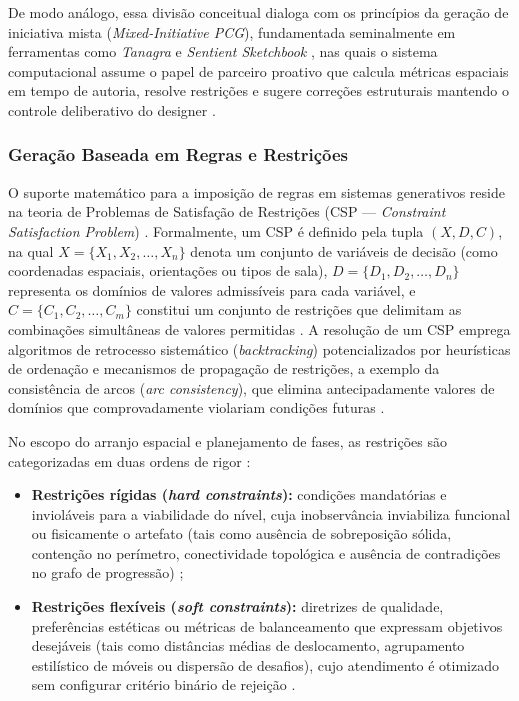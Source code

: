 De modo análogo, essa divisão conceitual dialoga com os princípios da geração de iniciativa mista (\textit{Mixed-Initiative PCG}), fundamentada seminalmente em ferramentas como \textit{Tanagra} \cite{tanagra} e \textit{Sentient Sketchbook} \cite{liapis2013sentient}, nas quais o sistema computacional assume o papel de parceiro proativo que calcula métricas espaciais em tempo de autoria, resolve restrições e sugere correções estruturais mantendo o controle deliberativo do designer \cite{tanagra, liapis2013sentient, lai2020towards, walton2020evaluating, wang2026designerlyloop}.

\subsubsection{Geração Baseada em Regras e Restrições}
\label{sec:geracao_restricoes}

O suporte matemático para a imposição de regras em sistemas generativos reside na teoria de Problemas de Satisfação de Restrições (CSP --- \textit{Constraint Satisfaction Problem}) \cite{russell2021artificial}. Formalmente, um CSP é definido pela tupla $(X, D, C)$, na qual $X = \{X_1, X_2, \dots, X_n\}$ denota um conjunto de variáveis de decisão (como coordenadas espaciais, orientações ou tipos de sala), $D = \{D_1, D_2, \dots, D_n\}$ representa os domínios de valores admissíveis para cada variável, e $C = \{C_1, C_2, \dots, C_m\}$ constitui um conjunto de restrições que delimitam as combinações simultâneas de valores permitidas \cite{russell2021artificial}. A resolução de um CSP emprega algoritmos de retrocesso sistemático (\textit{backtracking}) potencializados por heurísticas de ordenação e mecanismos de propagação de restrições, a exemplo da consistência de arcos (\textit{arc consistency}), que elimina antecipadamente valores de domínios que comprovadamente violariam condições futuras \cite{russell2021artificial}.

No escopo do arranjo espacial e planejamento de fases, as restrições são categorizadas em duas ordens de rigor \cite{tanagra, xu2025constraint, xu2025databasedrivenframework3dlevel}:
\begin{itemize}
    \item \textbf{Restrições rígidas (\textit{hard constraints}):} condições mandatórias e invioláveis para a viabilidade do nível, cuja inobservância inviabiliza funcional ou fisicamente o artefato (tais como ausência de sobreposição sólida, contenção no perímetro, conectividade topológica e ausência de contradições no grafo de progressão) \cite{tanagra, sun2024roomplanner, xu2025constraint};
    \item \textbf{Restrições flexíveis (\textit{soft constraints}):} diretrizes de qualidade, preferências estéticas ou métricas de balanceamento que expressam objetivos desejáveis (tais como distâncias médias de deslocamento, agrupamento estilístico de móveis ou dispersão de desafios), cujo atendimento é otimizado sem configurar critério binário de rejeição \cite{xu2025constraint, xu2025databasedrivenframework3dlevel}.
\end{itemize}

